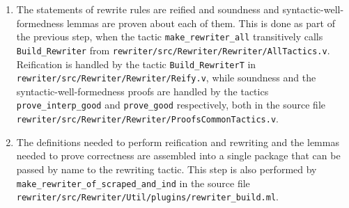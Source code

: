 \begin{subappendices}
\begin{enumerate}
  \item
    The statements of rewrite rules are reified and soundness and syntactic-well-formedness lemmas are proven about each of them.
    This is done as part of the previous step, when the tactic \texttt{make\_rewriter\_all} transitively calls \texttt{Build\_Rewriter} from \texttt{rewriter/src/Rewriter/Rewriter/AllTactics.v}.
    Reification is handled by the tactic \texttt{Build\_RewriterT} in \texttt{rewriter/src/Rewriter/Rewriter/Reify.v}, while soundness and the syntactic-well-formedness proofs are handled by the tactics \texttt{prove\_interp\_good} and \texttt{prove\_good} respectively, both in the source file \texttt{rewriter/src/Rewriter/Rewriter/ProofsCommonTactics.v}.
  \item
    The definitions needed to perform reification and rewriting and the lemmas needed to prove correctness are assembled into a single package that can be passed by name to the rewriting tactic.
    This step is also performed by \texttt{make\_rewriter\_of\_scraped\_and\_ind} in the source file \texttt{rewriter/src/Rewriter/Util/plugins/rewriter\_build.ml}.
\end{enumerate}


\end{subappendices}

